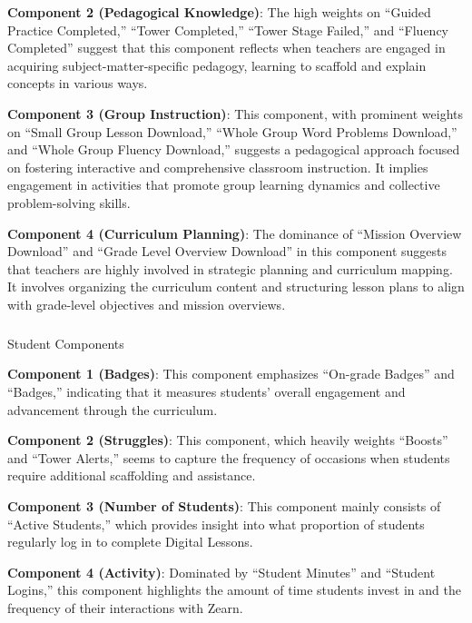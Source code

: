 \documentclass[
  number,
  preprint,
  3p,
  onecolumn]{elsarticle}
\makeatletter
\let\oldsubparagraph\subparagraph
\renewcommand{\subparagraph}{
    \@ifstar
      \xxxSubParagraphStar
      \xxxSubParagraphNoStar
  }
\newcommand{\xxxSubParagraphStar}[1]{\oldsubparagraph*{#1}\mbox{}}
\newcommand{\xxxSubParagraphNoStar}[1]{\oldsubparagraph{#1}\mbox{}}
\makeatother
\begin{document}
\textbf{Component 2 (Pedagogical Knowledge)}: The high weights on
``Guided Practice Completed,'' ``Tower Completed,'' ``Tower Stage
Failed,'' and ``Fluency Completed'' suggest that this component reflects
when teachers are engaged in acquiring subject-matter-specific pedagogy,
learning to scaffold and explain concepts in various ways.

\textbf{Component 3 (Group Instruction)}: This component, with prominent
weights on ``Small Group Lesson Download,'' ``Whole Group Word Problems
Download,'' and ``Whole Group Fluency Download,'' suggests a pedagogical
approach focused on fostering interactive and comprehensive classroom
instruction. It implies engagement in activities that promote group
learning dynamics and collective problem-solving skills.

\textbf{Component 4 (Curriculum Planning)}: The dominance of ``Mission
Overview Download'' and ``Grade Level Overview Download'' in this
component suggests that teachers are highly involved in strategic
planning and curriculum mapping. It involves organizing the curriculum
content and structuring lesson plans to align with grade-level
objectives and mission overviews.

\subparagraph{Student Components}\label{student-components}

\textbf{Component 1 (Badges)}: This component emphasizes ``On-grade
Badges'' and ``Badges,'' indicating that it measures students' overall
engagement and advancement through the curriculum.

\textbf{Component 2 (Struggles)}: This component, which heavily weights
``Boosts'' and ``Tower Alerts,'' seems to capture the frequency of
occasions when students require additional scaffolding and assistance.

\textbf{Component 3 (Number of Students)}: This component mainly
consists of ``Active Students,'' which provides insight into what
proportion of students regularly log in to complete Digital Lessons.

\textbf{Component 4 (Activity)}: Dominated by ``Student Minutes'' and
``Student Logins,'' this component highlights the amount of time
students invest in and the frequency of their interactions with Zearn.
\end{document}
